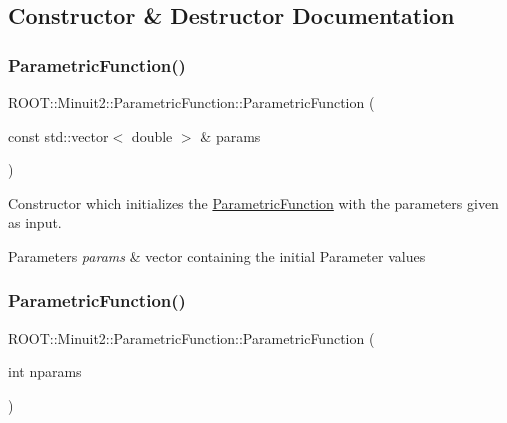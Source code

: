 \subsection{Constructor \& Destructor Documentation}
\mbox{\label{classROOT_1_1Minuit2_1_1ParametricFunction_a5abce16504b1532a38da1409afdaa71d}} 
\subsubsection{\texorpdfstring{ParametricFunction()}{ParametricFunction()}\hspace{0.1cm}{\footnotesize\ttfamily [1/6]}}
{\footnotesize\ttfamily R\+O\+O\+T\+::\+Minuit2\+::\+Parametric\+Function\+::\+Parametric\+Function (\begin{DoxyParamCaption}\item[{const std\+::vector$<$ double $>$ \&}]{params }\end{DoxyParamCaption})\hspace{0.3cm}{\ttfamily [inline]}}

Constructor which initializes the \mbox{\hyperlink{classROOT_1_1Minuit2_1_1ParametricFunction}{Parametric\+Function}} with the parameters given as input.


\begin{DoxyParams}{Parameters}
{\em params} & vector containing the initial Parameter values \\
\hline
\end{DoxyParams}
\mbox{\label{classROOT_1_1Minuit2_1_1ParametricFunction_a0b8e823b3a61fc0f20ffe419e0fa1e1a}} 
\subsubsection{\texorpdfstring{ParametricFunction()}{ParametricFunction()}\hspace{0.1cm}{\footnotesize\ttfamily [2/6]}}
{\footnotesize\ttfamily R\+O\+O\+T\+::\+Minuit2\+::\+Parametric\+Function\+::\+Parametric\+Function (\begin{DoxyParamCaption}\item[{int}]{nparams }\end{DoxyParamCaption})\hspace{0.3cm}{\ttfamily [inline]}}

